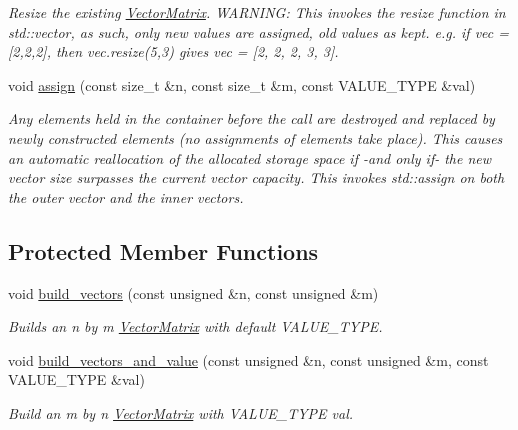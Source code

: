 \begin{DoxyCompactItemize}
\begin{DoxyCompactList}\small\item\em Resize the existing \hyperlink{classoomph_1_1VectorMatrix}{Vector\+Matrix}. W\+A\+R\+N\+I\+NG\+: This invokes the resize function in std\+::vector, as such, only new values are assigned, old values as kept. e.\+g. if vec = \mbox{[}2,2,2\mbox{]}, then vec.\+resize(5,3) gives vec = \mbox{[}2, 2, 2, 3, 3\mbox{]}. \end{DoxyCompactList}\item 
void \hyperlink{classoomph_1_1VectorMatrix_a4accbf71003ea0fe306689e6e68317cb}{assign} (const size\+\_\+t \&n, const size\+\_\+t \&m, const V\+A\+L\+U\+E\+\_\+\+T\+Y\+PE \&val)
\begin{DoxyCompactList}\small\item\em Any elements held in the container before the call are destroyed and replaced by newly constructed elements (no assignments of elements take place). This causes an automatic reallocation of the allocated storage space if -\/and only if-\/ the new vector size surpasses the current vector capacity. This invokes std\+::assign on both the outer vector and the inner vectors. \end{DoxyCompactList}\end{DoxyCompactItemize}
\subsection*{Protected Member Functions}
\begin{DoxyCompactItemize}
\item 
void \hyperlink{classoomph_1_1VectorMatrix_a0ab8c441cec95ba8322fc4ad9b97a288}{build\+\_\+vectors} (const unsigned \&n, const unsigned \&m)
\begin{DoxyCompactList}\small\item\em Builds an n by m \hyperlink{classoomph_1_1VectorMatrix}{Vector\+Matrix} with default V\+A\+L\+U\+E\+\_\+\+T\+Y\+PE. \end{DoxyCompactList}\item 
void \hyperlink{classoomph_1_1VectorMatrix_a23f3efbe283e626a815be17878dc8014}{build\+\_\+vectors\+\_\+and\+\_\+value} (const unsigned \&n, const unsigned \&m, const V\+A\+L\+U\+E\+\_\+\+T\+Y\+PE \&val)
\begin{DoxyCompactList}\small\item\em Build an m by n \hyperlink{classoomph_1_1VectorMatrix}{Vector\+Matrix} with V\+A\+L\+U\+E\+\_\+\+T\+Y\+PE val. \end{DoxyCompactList}\end{DoxyCompactItemize}
